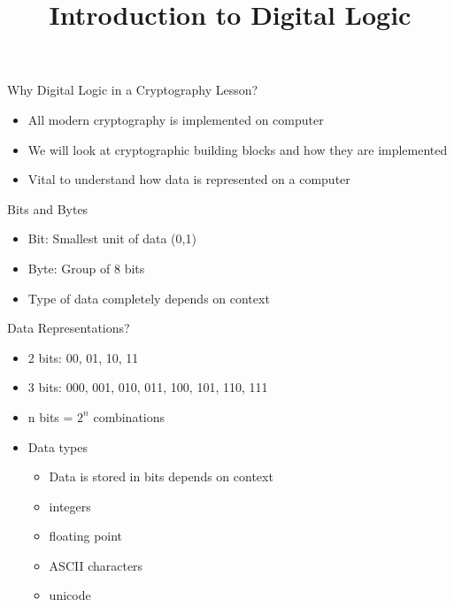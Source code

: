

\title[]{Introduction to Digital Logic}

\begin{frame}
\titlepage
\end{frame}

\begin{withoutheadline}

\begin{frame}{Why Digital Logic in a Cryptography Lesson?}
\begin{itemize}
    \item All modern cryptography is implemented on computer
    \item We will look at cryptographic building blocks and how they are implemented
    \item Vital to understand how data is represented on a computer
\end{itemize}
\end{frame}
    
\begin{frame}{Bits and Bytes}
\begin{itemize}
    \item Bit: Smallest unit of data (0,1)
    \item Byte: Group of 8 bits
    \item Type of data completely depends on context
\end{itemize}
\end{frame}

\begin{frame}{Data Representations?}
\begin{itemize}
    \item 2 bits: 00, 01, 10, 11
    \item 3 bits: 000, 001, 010, 011, 100, 101, 110, 111
    \item n bits = $2^n$ combinations
    \item Data types
   \begin{itemize}
       \item Data is stored in bits depends on context
       \item integers
       \item floating point
       \item ASCII characters
       \item unicode
   \end{itemize}
\end{itemize}
\end{frame}


\end{withoutheadline}
